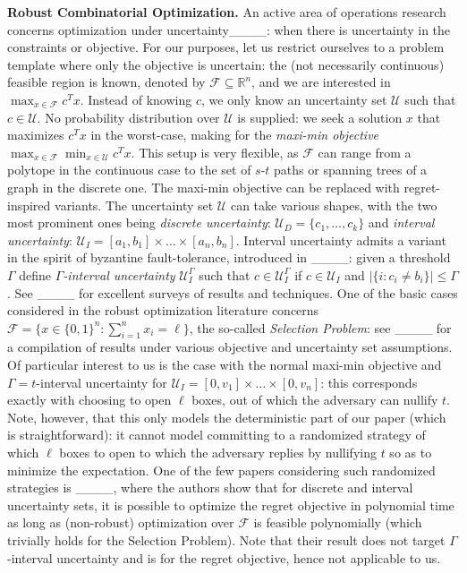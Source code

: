 \noindent \textbf{Robust Combinatorial Optimization.} An active area of operations research concerns optimization under uncertainty____: when there is uncertainty in the constraints or objective. 
For our purposes, let us restrict ourselves to a problem template where only the objective is uncertain: the (not necessarily continuous) feasible region is known, denoted by $\mathcal{F} \subseteq \mathbb{R}^n$, and we are interested in $\max_{x \in \mathcal{F}} c^T x$. Instead of knowing $c$, we only know an uncertainty set $\mathcal{U}$ such that $c \in \mathcal{U}$. No probability distribution over $\mathcal{U}$ is supplied: we seek a solution $x$ that maximizes $c^T x$ in the worst-case, making for the \emph{maxi-min objective} $\max_{x \in \mathcal{F}} \min_{x \in \mathcal{U}} c^T x$. This setup is very flexible, as $\mathcal{F}$ can range from a polytope in the continuous case to the set of $s$-$t$ paths or spanning trees of a graph in the discrete one. The maxi-min objective can be replaced with regret-inspired variants. The uncertainty set $\mathcal{U}$ can take various shapes, with the two most prominent ones being \emph{discrete uncertainty}: $\mathcal{U}_D = \{c_1, \dots, c_k\}$ and \emph{interval uncertainty}: $\mathcal{U}_I = [a_1, b_1] \times \dots \times [a_n, b_n]$. Interval uncertainty admits a variant in the spirit of byzantine fault-tolerance, introduced in ____: given a threshold $\Gamma$ define \emph{$\Gamma$-interval uncertainty} $\mathcal{U}_I^\Gamma$ such that $c \in \mathcal{U}_I^\Gamma$ if $c \in \mathcal{U}_I$ and $|\{i : c_i \neq b_i\}| \leq \Gamma$. See ____ for excellent surveys of results and techniques. One of the basic cases considered in the robust optimization literature concerns $\mathcal{F} = \{x \in \{0, 1\}^n : \sum_{i = 1}^n x_i = \ell\}$, the so-called \emph{Selection Problem}: see ____ for a compilation of results under various objective and uncertainty set assumptions. Of particular interest to us is the case with the normal maxi-min objective and $\Gamma=t$-interval uncertainty for $\mathcal{U}_I = [0, v_1] \times \dots \times [0, v_n]$: this corresponds exactly with choosing to open $\ell$ boxes, out of which the adversary can nullify $t$. Note, however, that this only models the deterministic part of our paper (which is straightforward): it cannot model committing to a randomized strategy of which $\ell$ boxes to open to which the adversary replies by nullifying $t$ so as to minimize the expectation. One of the few papers considering such randomized strategies is ____, where the authors show that for discrete and interval uncertainty sets, it is possible to optimize the regret objective in polynomial time as long as (non-robust) optimization over $\mathcal{F}$ is feasible polynomially (which trivially holds for the Selection Problem). Note that their result does not target $\Gamma$-interval uncertainty and is for the regret objective, hence not applicable to us. 
